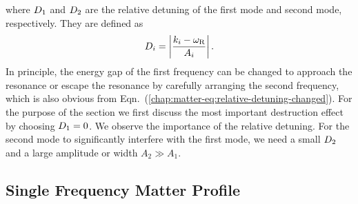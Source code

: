 where $D_1$ and $D_2$ are the relative detuning of the first mode and second mode, respectively. They are defined as
\begin{equation*}
D_i =  \left\lvert \frac{ k_i - \omega_{\mathrm R}}{A_i} \right \rvert.
\end{equation*}
In principle, the energy gap of the first frequency can be changed to approach the resonance or escape the resonance by carefully arranging the second frequency, which is also obvious from Eqn.~(\ref{chap:matter-eq:relative-detuning-changed}). For the purpose of the section we first discuss the most important destruction effect by choosing $D_1 = 0$. We observe the importance of the relative detuning. For the second mode to significantly interfere with the first mode, we need a small $D_2$ and a large amplitude or width $A_2\gg A_1$.


\subsection{\label{chap:matter-sec:single-frequency-matter-profile}Single Frequency Matter Profile}


